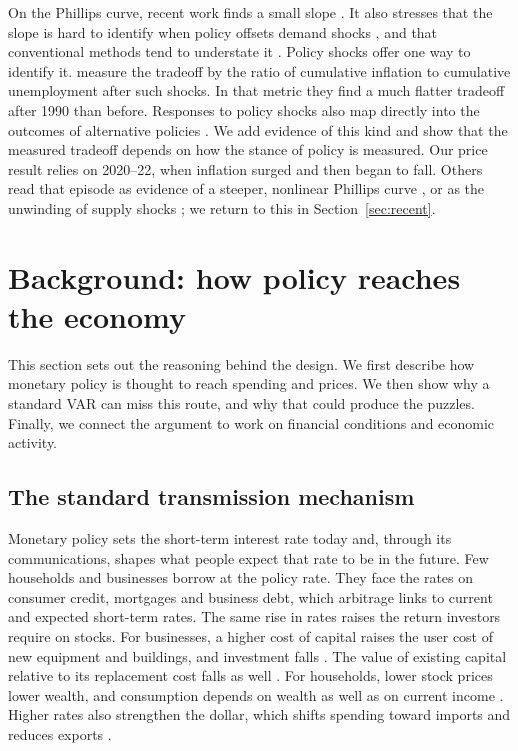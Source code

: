 \documentclass[11pt]{article}
\begin{document}
On the Phillips curve, recent work finds a small slope \citep{hazell2022,delnegro2020,ball2019,fitzgerald2024}. It also stresses that the slope is hard to identify when policy offsets demand shocks \citep{mcleay2020}, and that conventional methods tend to understate it \citep{barnichon2020}. Policy shocks offer one way to identify it. \citet{barnichon2021} measure the tradeoff by the ratio of cumulative inflation to cumulative unemployment after such shocks. In that metric they find a much flatter tradeoff after 1990 than before. Responses to policy shocks also map directly into the outcomes of alternative policies \citep{mckay2023}. We add evidence of this kind and show that the measured tradeoff depends on how the stance of policy is measured. Our price result relies on 2020--22, when inflation surged and then began to fall. Others read that episode as evidence of a steeper, nonlinear Phillips curve \citep{benigno2023}, or as the unwinding of supply shocks \citep{bernanke2025}; we return to this in Section~\ref{sec:recent}.

\section{Background: how policy reaches the economy}\label{sec:background}
This section sets out the reasoning behind the design. We first describe how monetary policy is thought to reach spending and prices. We then show why a standard VAR can miss this route, and why that could produce the puzzles. Finally, we connect the argument to work on financial conditions and economic activity.

\subsection{The standard transmission mechanism}
Monetary policy sets the short-term interest rate today and, through its communications, shapes what people expect that rate to be in the future. Few households and businesses borrow at the policy rate. They face the rates on consumer credit, mortgages and business debt, which arbitrage links to current and expected short-term rates. The same rise in rates raises the return investors require on stocks. For businesses, a higher cost of capital raises the user cost of new equipment and buildings, and investment falls \citep{jorgenson1963,hall1967}. The value of existing capital relative to its replacement cost falls as well \citep{tobin1969}. For households, lower stock prices lower wealth, and consumption depends on wealth as well as on current income \citep{ando1963,friedman1957}. Higher rates also strengthen the dollar, which shifts spending toward imports and reduces exports \citep{fleming1962,mundell1963}.
\end{document}
